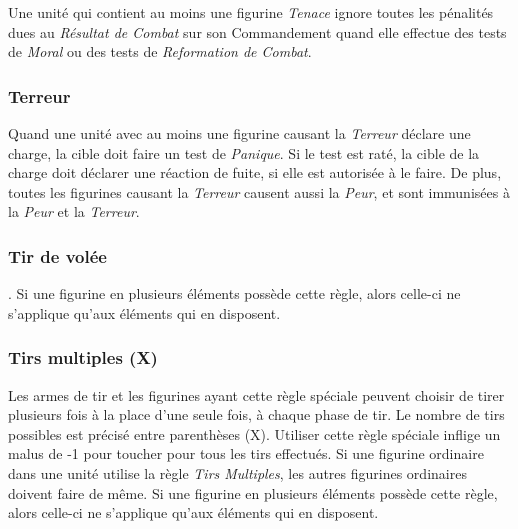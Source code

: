 Une unité qui contient au moins une figurine \emph{Tenace} ignore toutes les pénalités dues au \emph{Résultat de Combat} sur son Commandement quand elle effectue des tests de \emph{Moral} ou des tests de \emph{Reformation de Combat}.

\subsubsection*{Terreur}

Quand une unité avec au moins une figurine causant la \emph{Terreur} déclare une charge, la cible doit faire un test de \emph{Panique}. Si le test est raté, la cible de la charge doit déclarer une réaction de fuite, si elle est autorisée à le faire. De plus, toutes les figurines causant la \emph{Terreur} causent aussi la \emph{Peur}, et sont immunisées à la \emph{Peur} et la \emph{Terreur}.

\subsubsection*{Tir de volée}


. Si une figurine en plusieurs éléments possède cette règle, alors celle-ci ne s'applique qu'aux éléments qui en disposent.

\subsubsection*{Tirs multiples (X)}

Les armes de tir et les figurines ayant cette règle spéciale peuvent choisir de tirer plusieurs fois à la place d'une seule fois, à chaque phase de tir. Le nombre de tirs possibles est précisé entre parenthèses (X). Utiliser cette règle spéciale inflige un malus de -1 pour toucher pour tous les tirs effectués. Si une figurine ordinaire dans une unité utilise la règle \emph{Tirs Multiples}, les autres figurines ordinaires doivent faire de même. Si une figurine en plusieurs éléments possède cette règle, alors celle-ci ne s'applique qu'aux éléments qui en disposent.

